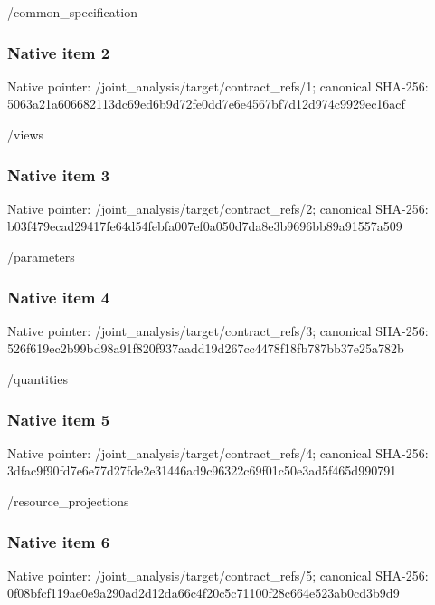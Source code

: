 \documentclass[10pt,a4paper]{article}
\begin{document}
\begingroup\raggedright\sloppy /\allowbreak{}common\_\allowbreak{}specification\par\endgroup

\subsubsection{Native item 2}
Native pointer: /joint\_\allowbreak{}analysis/target/contract\_\allowbreak{}refs/1; canonical SHA-256: 5063a21a606682113dc69ed6b9d72fe0dd7e6e4567bf7d12d974c9929ec16acf

\begingroup\raggedright\sloppy /\allowbreak{}views\par\endgroup

\subsubsection{Native item 3}
Native pointer: /joint\_\allowbreak{}analysis/target/contract\_\allowbreak{}refs/2; canonical SHA-256: b03f479ecad29417fe64d54febfa007ef0a050d7da8e3b9696bb89a91557a509

\begingroup\raggedright\sloppy /\allowbreak{}parameters\par\endgroup

\subsubsection{Native item 4}
Native pointer: /joint\_\allowbreak{}analysis/target/contract\_\allowbreak{}refs/3; canonical SHA-256: 526f619ec2b99bd98a91f820f937aadd19d267cc4478f18fb787bb37e25a782b

\begingroup\raggedright\sloppy /\allowbreak{}quantities\par\endgroup

\subsubsection{Native item 5}
Native pointer: /joint\_\allowbreak{}analysis/target/contract\_\allowbreak{}refs/4; canonical SHA-256: 3dfac9f90fd7e6e77d27fde2e31446ad9c96322c69f01c50e3ad5f465d990791

\begingroup\raggedright\sloppy /\allowbreak{}resource\_\allowbreak{}projections\par\endgroup

\subsubsection{Native item 6}
Native pointer: /joint\_\allowbreak{}analysis/target/contract\_\allowbreak{}refs/5; canonical SHA-256: 0f08bfcf119ae0e9a290ad2d12da66c4f20c5c71100f28c664e523ab0cd3b9d9
\end{document}
